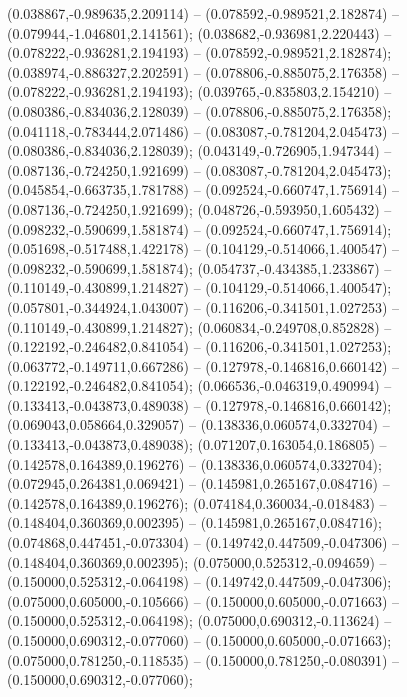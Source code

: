  (0.038867,-0.989635,2.209114) -- (0.078592,-0.989521,2.182874) -- (0.079944,-1.046801,2.141561);
 (0.038682,-0.936981,2.220443) -- (0.078222,-0.936281,2.194193) -- (0.078592,-0.989521,2.182874);
 (0.038974,-0.886327,2.202591) -- (0.078806,-0.885075,2.176358) -- (0.078222,-0.936281,2.194193);
 (0.039765,-0.835803,2.154210) -- (0.080386,-0.834036,2.128039) -- (0.078806,-0.885075,2.176358);
 (0.041118,-0.783444,2.071486) -- (0.083087,-0.781204,2.045473) -- (0.080386,-0.834036,2.128039);
 (0.043149,-0.726905,1.947344) -- (0.087136,-0.724250,1.921699) -- (0.083087,-0.781204,2.045473);
 (0.045854,-0.663735,1.781788) -- (0.092524,-0.660747,1.756914) -- (0.087136,-0.724250,1.921699);
 (0.048726,-0.593950,1.605432) -- (0.098232,-0.590699,1.581874) -- (0.092524,-0.660747,1.756914);
 (0.051698,-0.517488,1.422178) -- (0.104129,-0.514066,1.400547) -- (0.098232,-0.590699,1.581874);
 (0.054737,-0.434385,1.233867) -- (0.110149,-0.430899,1.214827) -- (0.104129,-0.514066,1.400547);
 (0.057801,-0.344924,1.043007) -- (0.116206,-0.341501,1.027253) -- (0.110149,-0.430899,1.214827);
 (0.060834,-0.249708,0.852828) -- (0.122192,-0.246482,0.841054) -- (0.116206,-0.341501,1.027253);
 (0.063772,-0.149711,0.667286) -- (0.127978,-0.146816,0.660142) -- (0.122192,-0.246482,0.841054);
 (0.066536,-0.046319,0.490994) -- (0.133413,-0.043873,0.489038) -- (0.127978,-0.146816,0.660142);
 (0.069043,0.058664,0.329057) -- (0.138336,0.060574,0.332704) -- (0.133413,-0.043873,0.489038);
 (0.071207,0.163054,0.186805) -- (0.142578,0.164389,0.196276) -- (0.138336,0.060574,0.332704);
 (0.072945,0.264381,0.069421) -- (0.145981,0.265167,0.084716) -- (0.142578,0.164389,0.196276);
 (0.074184,0.360034,-0.018483) -- (0.148404,0.360369,0.002395) -- (0.145981,0.265167,0.084716);
 (0.074868,0.447451,-0.073304) -- (0.149742,0.447509,-0.047306) -- (0.148404,0.360369,0.002395);
 (0.075000,0.525312,-0.094659) -- (0.150000,0.525312,-0.064198) -- (0.149742,0.447509,-0.047306);
 (0.075000,0.605000,-0.105666) -- (0.150000,0.605000,-0.071663) -- (0.150000,0.525312,-0.064198);
 (0.075000,0.690312,-0.113624) -- (0.150000,0.690312,-0.077060) -- (0.150000,0.605000,-0.071663);
 (0.075000,0.781250,-0.118535) -- (0.150000,0.781250,-0.080391) -- (0.150000,0.690312,-0.077060);
